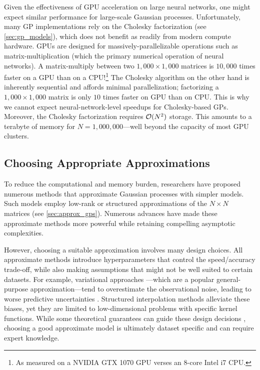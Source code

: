 Given the effectiveness of GPU acceleration on large neural networks, one might expect similar performance for large-scale Gaussian processes.
Unfortunately, many GP implementations rely on the Cholesky factorization (see \cref{sec:gp_models}), which does not benefit as readily from modern compute hardware.
GPUs are designed for massively-parallelizable operations such as matrix-multiplication (which the primary numerical operation of neural networks).
A matrix-multiply between two $1,\!000 \times 1,\!000$ matrices is $10,\!000$ times faster on a GPU than on a CPU!\footnote{
	As measured on a NVIDIA GTX 1070 GPU verses an 8-core Intel i7 CPU.
}
The Cholesky algorithm on the other hand is inherently sequential and affords minimal parallelization;
factorizing a $1,\!000 \times 1,\!000$ matrix is only $10$ times faster on GPU than on CPU.
This is why we cannot expect neural-network-level speedups for Cholesky-based GPs.
Moreover, the Cholesky factorization requires $\bigo{N^2}$ storage.
This amounts to a terabyte of memory for $N=1,\!000,\!000$---well beyond the capacity of most GPU clusters.

\subsection{Choosing Appropriate Approximations}
To reduce the computational and memory burden, researchers have proposed numerous methods that approximate Gaussian processes with simpler models.
Such models employ low-rank or structured approximations of the $N \times N$ matrices (see \cref{sec:approx_gps}).
Numerous advances have made these approximate methods more powerful while retaining compelling asymptotic complexities.

However, choosing a suitable approximation involves many design choices.
All approximate methods introduce hyperparameters that control the speed/accuracy trade-off, while also making assumptions that might not be well suited to certain datasets.
For example, variational approaches \cite{titsias2009variational}---which are a popular general-purpose approximation---tend to overestimate the observational noise, leading to worse predictive uncertainties \cite{turner2011two,bauer2016understanding}.
Structured interpolation methods \cite{wilson2015kernel} alleviate these biases, yet they are limited to low-dimensional problems with specific kernel functions.
While some theoretical guarantees can guide these design decisions \cite{burt2019rates}, choosing a good approximate model is ultimately dataset specific and can require expert knowledge.

